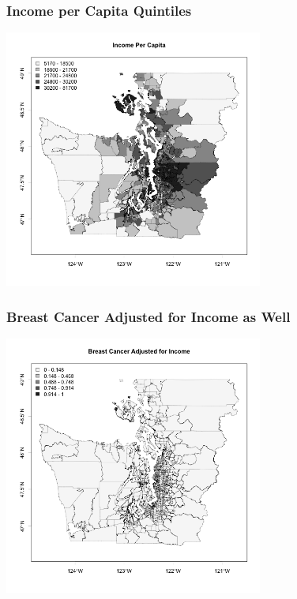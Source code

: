 \documentclass[slides]{beamer}
\begin{document}
\begin{frame}[fragile]
\frametitle{Income per Capita Quintiles}
\begin{center}
\includegraphics[width=8.5cm]{figure/income.png}
\end{center}
\end{frame}


\begin{frame}[fragile]
\frametitle{Breast Cancer Adjusted for Income as Well}
\begin{center}
\includegraphics[width=8.5cm]{figure/breast_new.png}
\end{center}
\end{frame}
\end{document}
